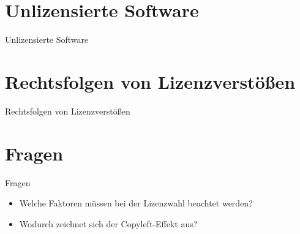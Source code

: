 \documentclass{beamer}
\begin{document}
\section{Unlizensierte Software}
\begin{frame}{Unlizensierte Software}
\end{frame}

\section{Rechtsfolgen von Lizenzverstößen}
\begin{frame}{Rechtsfolgen von Lizenzverstößen}
\end{frame}

\section{Fragen}
\begin{frame}{Fragen}
	\begin{itemize}
		\item Welche Faktoren müssen bei der Lizenzwahl beachtet werden?
		\item Wodurch zeichnet sich der Copyleft-Effekt aus? %
	\end{itemize}
\end{frame}



\end{document}
